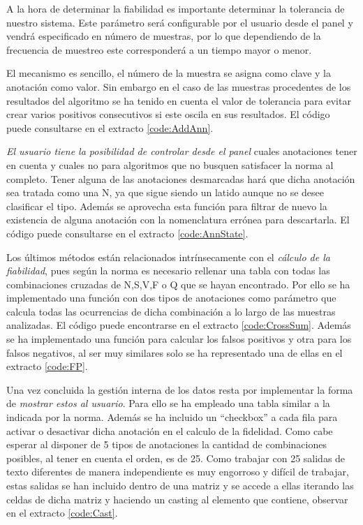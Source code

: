     A la hora de determinar la fiabilidad es importante determinar la tolerancia de nuestro sistema. Este parámetro será configurable por el usuario desde el panel y vendrá especificado en número de muestras, por lo que dependiendo de la frecuencia de muestreo este corresponderá a un tiempo mayor o menor.

    El mecanismo es sencillo, el número de la muestra se asigna como clave y la anotación como valor. Sin embargo en el caso de las muestras procedentes de los resultados del algoritmo se ha tenido en cuenta el valor de tolerancia para evitar crear varios positivos consecutivos si este oscila en sus resultados. El código puede consultarse en el extracto \ref{code:AddAnn}.
        

    \textit{El usuario tiene la posibilidad de controlar desde el panel} cuales anotaciones tener en cuenta y cuales no para algoritmos que no busquen satisfacer la norma al completo. Tener alguna de las anotaciones desmarcadas hará que dicha anotación sea tratada como una N, ya que sigue siendo un latido aunque no se desee clasificar el tipo. Además se aprovecha esta función para filtrar de nuevo la existencia de alguna anotación con la nomenclatura errónea para descartarla. El código puede consultarse en el extracto \ref{code:AnnState}.
        
        
    Los últimos métodos están relacionados intrínsecamente con el \textit{cálculo de la fiabilidad}, pues según la norma es necesario rellenar una tabla con todas las combinaciones cruzadas de N,S,V,F o Q que se hayan encontrado. Por ello se ha implementado una función con dos tipos de anotaciones como parámetro que calcula todas las ocurrencias de dicha combinación a lo largo de las muestras analizadas. El código puede encontrarse en el extracto \ref{code:CrossSum}. Además se ha implementado una función para calcular los falsos positivos y otra para los falsos negativos, al ser muy similares solo se ha representado una de ellas en el extracto \ref{code:FP}.
        
  
    \clearpage
    Una vez concluida la gestión interna de los datos resta por implementar la forma de\textit{ mostrar estos al usuario}. Para ello se ha empleado una tabla similar a la indicada por la norma.\cite{Aenor2002} Además se ha incluido un ``checkbox'' a cada fila para activar o desactivar dicha anotación en el calculo de la fidelidad. Como cabe esperar al disponer de 5 tipos de anotaciones la cantidad de combinaciones posibles, al tener en cuenta el orden, es de 25. Como trabajar con 25 salidas de texto diferentes de manera independiente es muy engorroso y difícil de trabajar, estas salidas se han incluido dentro de una matriz y se accede a ellas iterando las celdas de dicha matriz y haciendo un casting al elemento que contiene, observar en el extracto \ref{code:Cast}. 
        
